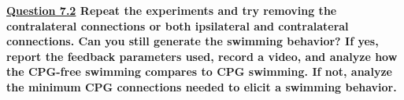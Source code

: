 \documentclass{cmc}
\begin{document}
\textbf{\underline{Question 7.2} Repeat the experiments and try removing the contralateral connections or both ipsilateral and contralateral connections. Can you still generate the swimming behavior? If yes, report the feedback parameters used, record a video, and analyze how the CPG-free swimming compares to CPG swimming. If not, analyze the minimum CPG connections needed to elicit a swimming behavior.
}







\label{sec:references}






\end{document}
